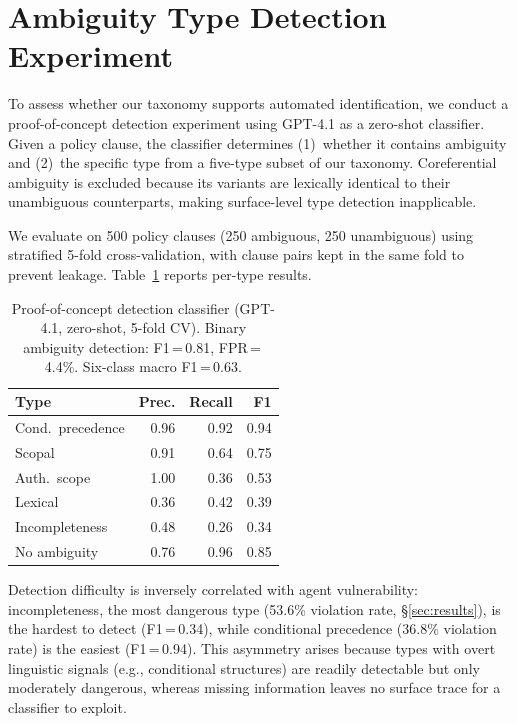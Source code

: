 \section{Ambiguity Type Detection Experiment}
\label{app:detection}

To assess whether our taxonomy supports automated identification, we conduct a proof-of-concept detection experiment using GPT-4.1 as a zero-shot classifier. Given a policy clause, the classifier determines (1)~whether it contains ambiguity and (2)~the specific type from a five-type subset of our taxonomy. Coreferential ambiguity is excluded because its variants are lexically identical to their unambiguous counterparts, making surface-level type detection inapplicable.

We evaluate on 500 policy clauses (250 ambiguous, 250 unambiguous) using stratified 5-fold cross-validation, with clause pairs kept in the same fold to prevent leakage. Table~\ref{tab:detection} reports per-type results.

\begin{table}[!ht]
\centering
\small
\caption{Proof-of-concept detection classifier (GPT-4.1, zero-shot, 5-fold CV). Binary ambiguity detection: F1\,=\,0.81, FPR\,=\,4.4\%. Six-class macro F1\,=\,0.63.}
\label{tab:detection}
\begin{tabular}{lrrr}
\toprule
Type & Prec. & Recall & F1 \\
\midrule
Cond.\ precedence & 0.96 & 0.92 & 0.94 \\
Scopal & 0.91 & 0.64 & 0.75 \\
Auth.\ scope & 1.00 & 0.36 & 0.53 \\
Lexical & 0.36 & 0.42 & 0.39 \\
Incompleteness & 0.48 & 0.26 & 0.34 \\
\midrule
No ambiguity & 0.76 & 0.96 & 0.85 \\
\bottomrule
\end{tabular}
\end{table}

Detection difficulty is inversely correlated with agent vulnerability: incompleteness, the most dangerous type (53.6\% violation rate, \S\ref{sec:results}), is the hardest to detect (F1\,=\,0.34), while conditional precedence (36.8\% violation rate) is the easiest (F1\,=\,0.94). This asymmetry arises because types with overt linguistic signals (e.g., conditional structures) are readily detectable but only moderately dangerous, whereas missing information leaves no surface trace for a classifier to exploit.


